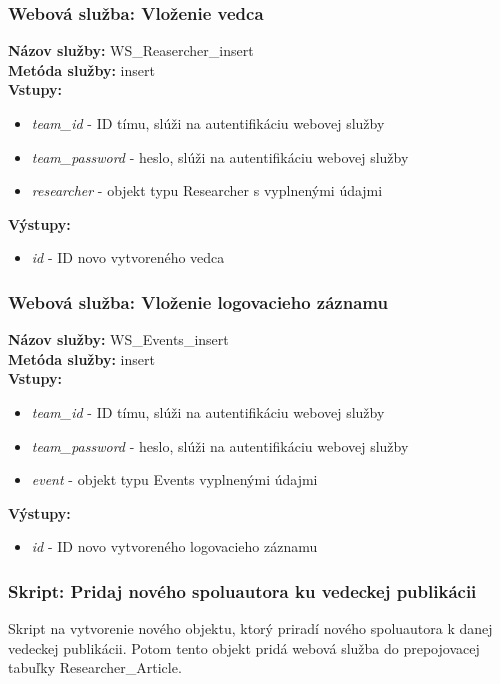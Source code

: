 \documentclass[10pt,oneside,slovak,a4paper]{article}
\begin{document}
\subsubsection{Webová služba: Vloženie vedca}
\textbf{Názov služby:} WS\_Reasercher\_insert\\
\textbf{Metóda služby:} insert\\
\textbf{Vstupy:}
	\begin{itemize}
		\item \textit{team\_id} - ID tímu, slúži na autentifikáciu webovej služby
		\item \textit{team\_password} - heslo, slúži na autentifikáciu webovej služby
		\item \textit{researcher} - objekt typu Researcher s vyplnenými údajmi
	\end{itemize}
\textbf{Výstupy:}
	\begin{itemize}
		\item \textit{id} - ID novo vytvoreného vedca
	\end{itemize}

\subsubsection{Webová služba: Vloženie logovacieho záznamu}
\textbf{Názov služby:} WS\_Events\_insert\\
\textbf{Metóda služby:} insert\\
\textbf{Vstupy:}
	\begin{itemize}
		\item \textit{team\_id} - ID tímu, slúži na autentifikáciu webovej služby
		\item \textit{team\_password} - heslo, slúži na autentifikáciu webovej služby
		\item \textit{event} - objekt typu Events vyplnenými údajmi
	\end{itemize}
\textbf{Výstupy:}
	\begin{itemize}
		\item \textit{id} - ID novo vytvoreného logovacieho záznamu
	\end{itemize}
	
\subsubsection{Skript: Pridaj nového spoluautora ku vedeckej publikácii}
Skript na vytvorenie nového objektu, ktorý priradí nového spoluautora k danej vedeckej publikácii. Potom tento objekt pridá webová služba do prepojovacej tabuľky Researcher\_Article.
\end{document}
